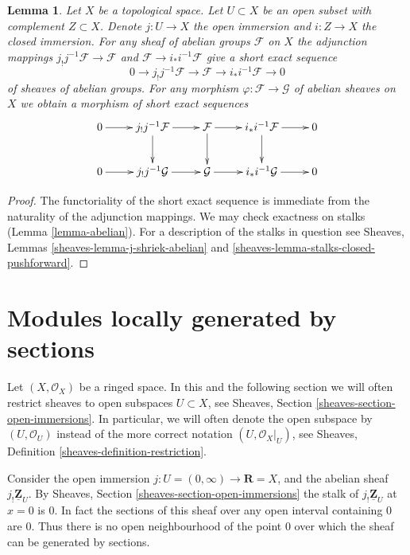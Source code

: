 \documentclass{stacks-project}
\theoremstyle{plain}
\newtheorem{lemma}[subsection]{Lemma}
\theoremstyle{definition}
\theoremstyle{remark}
\numberwithin{equation}{subsection}
\begin{document}
\begin{lemma}
\label{lemma-canonical-exact-sequence}
Let $X$ be a topological space.
Let $U \subset X$ be an open subset with complement $Z \subset X$.
Denote $j : U \to X$ the open immersion and
$i : Z \to X$ the closed immersion.
For any sheaf of abelian groups $\mathcal{F}$ on $X$
the adjunction mappings $j_{!}j^{-1}\mathcal{F} \to \mathcal{F}$ and
$\mathcal{F} \to i_*i^{-1}\mathcal{F}$ give a short exact
sequence
$$
0 \to j_{!}j^{-1}\mathcal{F} \to \mathcal{F} \to i_*i^{-1}\mathcal{F} \to 0
$$
of sheaves of abelian groups. For any morphism
$\varphi : \mathcal{F} \to \mathcal{G}$ of abelian sheaves on $X$
we obtain a morphism of short exact sequences
$$
\xymatrix{
0 \ar[r] &
j_{!}j^{-1}\mathcal{F} \ar[r] \ar[d] &
\mathcal{F} \ar[r] \ar[d] &
i_*i^{-1}\mathcal{F} \ar[r] \ar[d] &
0 \\
0 \ar[r] &
j_{!}j^{-1}\mathcal{G} \ar[r] &
\mathcal{G} \ar[r] &
i_*i^{-1}\mathcal{G} \ar[r] &
0
}
$$
\end{lemma}

\begin{proof}
The functoriality of the short exact sequence is
immediate from the naturality of the adjunction mappings.
We may check exactness on stalks (Lemma \ref{lemma-abelian}).
For a description of the stalks in question see
Sheaves, Lemmas \ref{sheaves-lemma-j-shriek-abelian}
and \ref{sheaves-lemma-stalks-closed-pushforward}.
\end{proof}








\section{Modules locally generated by sections}
\label{section-locally-generated}

\noindent
Let $(X, \mathcal{O}_X)$ be a ringed space.
In this and the following section we will often restrict
sheaves to open subspaces $U \subset X$, see
Sheaves, Section \ref{sheaves-section-open-immersions}.
In particular, we will often denote the open subspace
by $(U, \mathcal{O}_U)$ instead of the more correct
notation $(U, \mathcal{O}_X|_U)$, see
Sheaves, Definition \ref{sheaves-definition-restriction}.

\medskip\noindent
Consider the open immersion
$j : U = (0 , \infty) \to \mathbf{R} = X$, and the abelian sheaf
$j_!\underline{\mathbf{Z}}_U$. By Sheaves, Section
\ref{sheaves-section-open-immersions} the stalk of
$j_!\underline{\mathbf{Z}}_U$ at $x = 0$ is $0$. In fact the
sections of this sheaf over any open interval containing $0$
are $0$. Thus there is no open neighbourhood of the point
$0$ over which the sheaf can be generated by sections.
\end{document}
